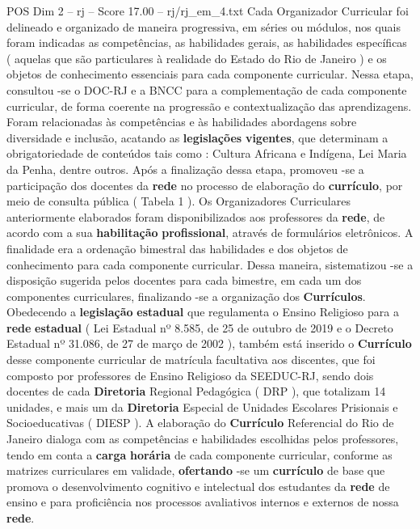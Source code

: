 \begin{textsample}{POS Dim 2 – rj – Score 17.00 – rj/rj\_em\_4.txt}
Cada Organizador Curricular foi delineado e organizado de maneira progressiva, em séries ou módulos, nos quais foram indicadas as competências, as habilidades gerais, as habilidades específicas ( aquelas que são particulares à realidade do Estado do Rio de Janeiro ) e os objetos de conhecimento essenciais para cada componente curricular.
Nessa etapa, consultou -se o DOC-RJ e a BNCC para a complementação de cada componente curricular, de forma coerente na progressão e contextualização das aprendizagens.
Foram relacionadas às competências e às habilidades abordagens sobre diversidade e inclusão, acatando as \textbf{legislações} \textbf{vigentes}, que determinam a obrigatoriedade de conteúdos tais como : Cultura Africana e Indígena, Lei Maria da Penha, dentre outros.
Após a finalização dessa etapa, promoveu -se a participação dos docentes da \textbf{rede} no processo de elaboração do \textbf{currículo}, por meio de consulta pública ( Tabela 1 ).
Os Organizadores Curriculares anteriormente elaborados foram disponibilizados aos professores da \textbf{rede}, de acordo com a sua \textbf{habilitação} \textbf{profissional}, através de formulários eletrônicos.
A finalidade era a ordenação bimestral das habilidades e dos objetos de conhecimento para cada componente curricular.
Dessa maneira, sistematizou -se a disposição sugerida pelos docentes para cada bimestre, em cada um dos componentes curriculares, finalizando -se a organização dos \textbf{Currículos}.
Obedecendo a \textbf{legislação} \textbf{estadual} que regulamenta o Ensino Religioso para a \textbf{rede} \textbf{estadual} ( Lei Estadual nº 8.585, de 25 de outubro de 2019 e o Decreto Estadual nº 31.086, de 27 de março de 2002 ), também está inserido o \textbf{Currículo} desse componente curricular de matrícula facultativa aos discentes, que foi composto por professores de Ensino Religioso da SEEDUC-RJ, sendo dois docentes de cada \textbf{Diretoria} Regional Pedagógica ( DRP ), que totalizam 14 unidades, e mais um da \textbf{Diretoria} Especial de Unidades Escolares Prisionais e Socioeducativas ( DIESP ).
A elaboração do \textbf{Currículo} Referencial do Rio de Janeiro dialoga com as competências e habilidades escolhidas pelos professores, tendo em conta a \textbf{carga} \textbf{horária} de cada componente curricular, conforme as matrizes curriculares em validade, \textbf{ofertando} -se um \textbf{currículo} de base que promova o desenvolvimento cognitivo e intelectual dos estudantes da \textbf{rede} de ensino e para proficiência nos processos avaliativos internos e externos de nossa \textbf{rede}.

\end{textsample}
